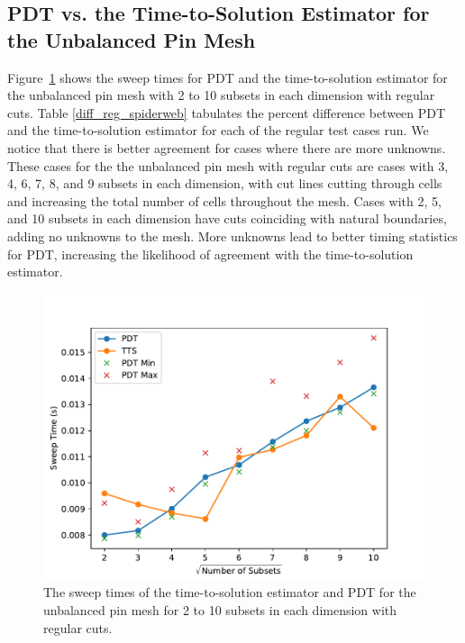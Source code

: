 \subsection{PDT vs. the Time-to-Solution Estimator for the Unbalanced Pin Mesh}
Figure~\ref{comp_reg_spiderweb} shows the sweep times for PDT and the time-to-solution estimator for the unbalanced pin mesh with 2 to 10 subsets in each dimension with regular cuts.
Table \ref{diff_reg_spiderweb} tabulates the percent difference between PDT and the time-to-solution estimator for each of the regular test cases run.
We notice that there is better agreement for cases where there are more unknowns.
These cases for the the unbalanced pin mesh with regular cuts are cases with 3, 4, 6, 7, 8, and 9 subsets in each dimension, with cut lines cutting through cells and increasing the total number of cells throughout the mesh.
Cases with 2, 5, and 10 subsets in each dimension have cuts coinciding with natural boundaries, adding no unknowns to the mesh.
More unknowns lead to better timing statistics for PDT, increasing the likelihood of agreement with the time-to-solution estimator.
\begin{figure}[!ht]
\centering
\includegraphics[scale=0.75]{../../figures/spiderweb_reg_pdtvtts.pdf}
\caption{The sweep times of the time-to-solution estimator and PDT for the unbalanced pin mesh for 2 to 10 subsets in each dimension with regular cuts.}
\label{comp_reg_spiderweb}
\end{figure}
